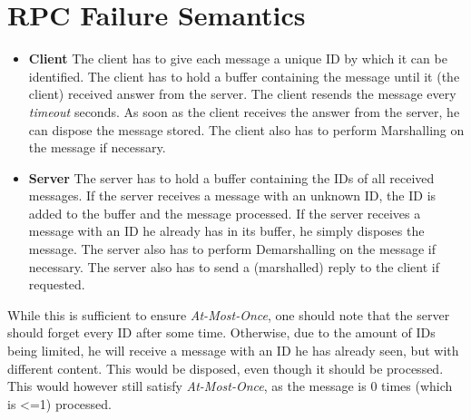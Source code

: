 \documentclass{tudexercise}
\begin{document}
	\section{RPC Failure Semantics}
		\begin{itemize}
			\item \textbf{Client} The client has to give each message a unique ID by which it can be identified. The client has to hold a buffer containing the message until it (the client) received answer from the server. The client resends the message every \textit{timeout} seconds. As soon as the client receives the answer from the server, he can dispose the message stored. The client also has to perform Marshalling on the message if necessary.
			\item \textbf{Server} The server has to hold a buffer containing the IDs of all received messages.  If the server receives a message with an unknown ID, the ID is added to the buffer and the message processed. If the server receives a message with an ID he already has in its buffer, he simply disposes the message. The server also has to perform Demarshalling on the message if necessary. The server also has to send a (marshalled) reply to the client if requested.
		\end{itemize}
		
		While this is sufficient to ensure \textit{At-Most-Once}, one should note that the server should forget every ID after some time. Otherwise, due to the amount of IDs being limited, he will receive a message with an ID he has already seen, but with different content. This would be disposed, even though it should be processed. This would however still satisfy \textit{At-Most-Once}, as the message is 0 times (which is <=1) processed.
		
\end{document}
